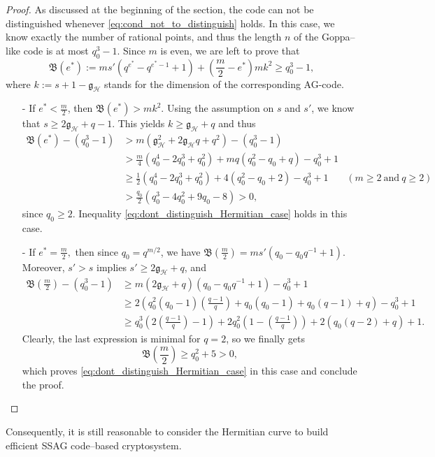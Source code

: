 \documentclass[a4paper]{amsart}
\theoremstyle{definition}
\theoremstyle{remark}
\newcommand{\calH}{\mathcal{H}}
\begin{document}
\begin{proof}
    As discussed at the beginning of the section, the code can not be distinguished whenever \eqref{eq:cond_not_to_distinguish} holds. In this case, we know exactly the number of rational points, and thus the length $n$ of the Goppa--like code is at most $q_0^3-1$. Since $m$ is even, we are left to prove that 
    \begin{equation} \label{eq:dont_distinguish_Hermitian_case}
    \mathfrak{B}(e^*) := ms'(q^{e^*}-q^{e^*-1}+1) + \left( \frac{m}{2}-e^*\right)mk^2 \geq q_0^3-1,
    \end{equation}
    where $k := s+1-\mathfrak{g}_{\calH}$ stands  for the dimension of the corresponding AG-code.
    \begin{itemize}
        \item [-] If $e^* < \frac{m}{2}$, then $\mathfrak{B}(e^*) > mk^2$. Using the assumption on $s$ and $s'$, we know that $s \geq 2\mathfrak{g}_{\calH}+q-1$. This yields $k \geq \mathfrak{g}_{\calH}+q$ and thus
        \begin{align*}
\mathfrak{B}(e^*) - (q_0^3-1) 
&> m(\mathfrak{g}_{\calH}^2+2\mathfrak{g}_{\calH}q+q^2)-(q_0^3-1)&\\
& > \frac{m}{4}(q_0^4-2q_0^3+q_0^2) + mq(q_0^2-q_0+q) -q_0^3+1 &\\
& \geq \frac{1}{2}(q_0^4-2q_0^3+q_0^2)+4(q_0^2-q_0+2)-q_0^3+1 \quad &(m\geq 2 \ \mathrm{and} \ q\geq 2)&\\
& > \frac{q_0}{2} (q_0^3-4q_0^2+9q_0-8) > 0,&
        \end{align*}
        since $q_0 \geq 2$. Inequality \eqref{eq:dont_distinguish_Hermitian_case} holds in this case.
        \item[-] If $e^* = \frac{m}{2},$ then since $q_0=q^{m/2}$, we have $\mathfrak{B}\left(\frac{m}{2}\right) = ms'(q_0-q_0q^{-1}+1)$. Moreover, $s'>s$ implies $s' \geq 2\mathfrak{g}_{\calH}+q$, and
        \begin{align*}
           \mathfrak{B}\left(\frac{m}{2}\right) - (q_0^3-1) 
           &\geq m(2\mathfrak{g}_{\calH}+q)(q_0-q_0q^{-1}+1)-q_0^3+1 \\ 
           &\geq 2\left(q_0^2(q_0-1)\left(\frac{q-1}{q}\right)+q_0(q_0-1)+q_0(q-1)+q\right)-q_0^3+1 \\
           & \geq q_0^3\left(2\left(\frac{q-1}{q}\right)-1\right) + 2q_0^2\left(1-\left(\frac{q-1}{q}\right)\right) + 2(q_0(q-2)+q)+1.
        \end{align*}
        Clearly, the last expression is minimal for $q=2$, so we finally gets
        $$\mathfrak{B}\left(\frac{m}{2}\right) \geq q_0^2 + 5 >0,$$
        which proves \eqref{eq:dont_distinguish_Hermitian_case} in this case and conclude the proof.
    \end{itemize}
\end{proof}
Consequently, it is still reasonable to consider the Hermitian curve to build efficient SSAG code--based cryptosystem.
\end{document}
